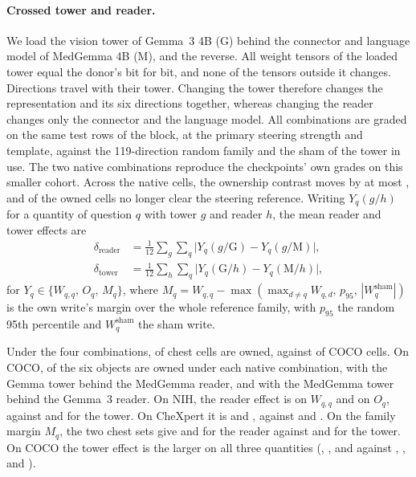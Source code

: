 \paragraph{Crossed tower and reader.}\label{app:cf-crossed-reader} We load the vision tower of Gemma~3 4B (G) behind the connector and language model of MedGemma 4B (M), and the reverse. All \cfSwapTensors{} weight tensors of the loaded tower equal the donor's bit for bit, and none of the \cfSwapOutside{} tensors outside it changes. Directions travel with their tower. Changing the tower therefore changes the representation and its six directions together, whereas changing the reader changes only the connector and the language model. All \cfSwapCombos{} combinations are graded on the same \cfSwapRows{} test rows of the block, at the primary steering strength and template, against the 119-direction random family and the sham of the tower in use. The two native combinations reproduce the checkpoints' own grades on this smaller cohort. Across the \cfSwapNativeCells{} native cells, the ownership contrast moves by at most \cfSwapNativeMaxDO{}, and \cfSwapNativeLostReference{} of the \cfSwapNativeOwnedFull{} owned cells no longer clear the steering reference. Writing $Y_q(g/h)$ for a quantity of question $q$ with tower $g$ and reader $h$, the mean reader and tower effects are
\begin{equation}
\begin{aligned}
\delta_{\text{reader}}&=\frac{1}{12}\sum_{g}\sum_{q}\bigl|Y_q(g/\mathrm G)-Y_q(g/\mathrm M)\bigr|,\\
\delta_{\text{tower}}&=\frac{1}{12}\sum_{h}\sum_{q}\bigl|Y_q(\mathrm G/h)-Y_q(\mathrm M/h)\bigr|,
\end{aligned}
\label{eq:crossover}
\end{equation}
for $Y_q\in\{W_{q,q},\,O_q,\,M_q\}$, where $M_q=W_{q,q}-\max(\max_{d\neq q}W_{q,d},\,p_{95},\,|W^{\mathrm{sham}}_q|)$ is the own write's margin over the whole reference family, with $p_{95}$ the random 95th percentile and $W^{\mathrm{sham}}_q$ the sham write.

Under the four combinations, \cfSwapChestOwned{} of \cfSwapChestCells{} chest cells are owned, against \cfSwapCocoOwned{} of \cfSwapCocoCells{} COCO cells. On COCO, \cfSwapCocoNativeMin{} of the six objects are owned under each native combination, \cfSwapCocoGemmaTowerCross{} with the Gemma tower behind the MedGemma reader, and \cfSwapCocoMedTowerCross{} with the MedGemma tower behind the Gemma~3 reader. On NIH, the reader effect is \cfSwapReaderNihMin{} on $W_{q,q}$ and \cfSwapReaderNihOMin{} on $O_q$, against \cfSwapTowerNihMin{} and \cfSwapTowerNihOMin{} for the tower. On CheXpert it is \cfSwapReaderChexMin{} and \cfSwapReaderChexOMin{}, against \cfSwapTowerChexMin{} and \cfSwapTowerChexOMin{}. On the family margin $M_q$, the two chest sets give \cfSwapReaderNihMMin{} and \cfSwapReaderChexMMin{} for the reader against \cfSwapTowerNihMMin{} and \cfSwapTowerChexMMin{} for the tower. On COCO the tower effect is the larger on all three quantities (\cfSwapTowerCocoMin{}, \cfSwapTowerCocoOMin{}, and \cfSwapTowerCocoMMin{} against \cfSwapReaderCocoMin{}, \cfSwapReaderCocoOMin{}, and \cfSwapReaderCocoMMin{}).

